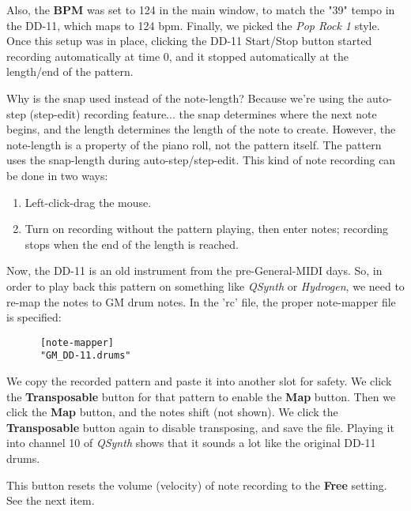    Also, the \textbf{BPM} was set to 124 in the main
   window, to match the "39" tempo in the DD-11, which maps to 124 bpm.
   Finally, we picked the \textsl{Pop Rock 1} style.  
   Once this setup was in place, clicking the DD-11 Start/Stop button started
   recording automatically at time 0, and it stopped automatically at the
   length/end of the pattern.

   Why is the snap used instead of the note-length?  Because we're using the
   auto-step (step-edit) recording feature...
   the snap determines where the next note
   begins, and the length determines the length of the note to create.
   However, the note-length is a property of the piano roll, not the pattern
   itself.  The pattern uses the snap-length during auto-step/step-edit.
   This kind of note recording can be done in two ways:

   \begin{enumerate}
      \item Left-click-drag the mouse.
      \item Turn on recording without the pattern playing, then
         enter notes; recording stops when the end of the length is reached.
   \end{enumerate}

   Now, the DD-11 is an old instrument from the pre-General-MIDI days.
   So, in order to play back this pattern on something like
   \textsl{QSynth} or \textsl{Hydrogen}, we need to re-map the notes to GM drum
   notes.  In the 'rc' file, the proper note-mapper file is specified:

   \begin{verbatim}
      [note-mapper]
      "GM_DD-11.drums"
   \end{verbatim}

   We copy the recorded pattern and paste it into another slot for safety.
   We click the \textbf{Transposable} button for that pattern to enable the
   \textbf{Map} button.  Then we click the \textbf{Map} button, and the notes
   shift (not shown).  
   We click the \textbf{Transposable} button again to disable transposing,
   and save the file.
   Playing it into channel 10 of \textsl{QSynth} shows that it sounds a lot
   like the original DD-11 drums.

   This button resets the volume (velocity)
   of note recording to the \textbf{Free} setting.
   See the next item.

